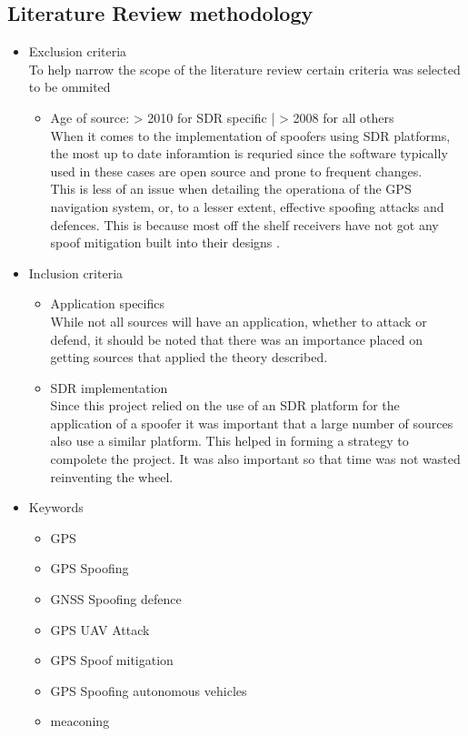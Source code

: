
\subsection{Literature Review methodology}
\begin{itemize}
    \item Exclusion criteria \\ To help narrow the scope of the literature review certain criteria was selected to be ommited
    \begin{itemize}
        \item Age of source: > 2010 for SDR specific | > 2008 for all others \\ When it comes to the implementation of spoofers using SDR platforms, the most up to date inforamtion is requried since the software typically used in these cases are open source and prone to frequent changes.\\ This is less of an issue when detailing the operationa of the GPS navigation system, or, to a lesser extent, effective spoofing attacks and defences. This is because most off the shelf receivers have not got any spoof mitigation built into their designs \cite{RN12}.
    \end{itemize}
    \item Inclusion criteria
    \begin{itemize}
        \item Application specifics \\ While not all sources will have an application, whether to attack or defend, it should be noted that there was an importance placed on getting sources that applied the theory described.
        \item SDR implementation \\ Since this project relied on the use of an SDR platform for the application of a spoofer it was important that a large number of sources also use a similar platform. This helped in forming a strategy to compolete the project. It was also important so that time was not wasted reinventing the wheel.
    \end{itemize}
    \item Keywords
    \begin{itemize}
        \item GPS
        \item GPS Spoofing
        \item GNSS Spoofing defence
        \item GPS UAV Attack
        \item GPS Spoof mitigation
        \item GPS Spoofing autonomous vehicles
        \item meaconing
    \end{itemize}
\end{itemize}


